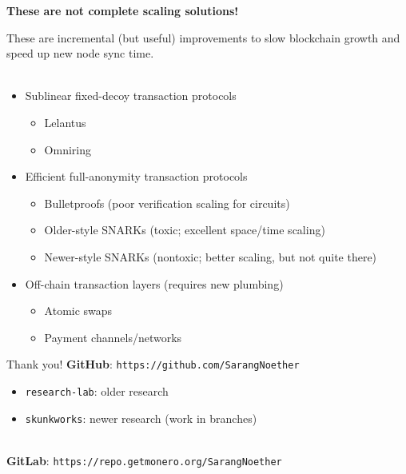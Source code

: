 \documentclass[aspectratio=169]{beamer}
\begin{document}
\begin{frame}
\begin{center}
\textbf{These are not complete scaling solutions!}
\end{center}

These are incremental (but useful) improvements to slow blockchain growth and speed up new node sync time. \\~\\

\begin{itemize}
\item Sublinear fixed-decoy transaction protocols
\begin{itemize}
\item Lelantus
\item Omniring
\end{itemize}
\item Efficient full-anonymity transaction protocols
\begin{itemize}
\item Bulletproofs (poor verification scaling for circuits)
\item Older-style SNARKs (toxic; excellent space/time scaling)
\item Newer-style SNARKs (nontoxic; better scaling, but not quite there)
\end{itemize}
\item Off-chain transaction layers (requires new plumbing)
\begin{itemize}
\item Atomic swaps
\item Payment channels/networks
\end{itemize}
\end{itemize}
\end{frame}


\begin{frame}{Thank you!}
\textbf{GitHub}: \texttt{https://github.com/SarangNoether}
\begin{itemize}
\item \texttt{research-lab}: older research
\item \texttt{skunkworks}: newer research (work in branches) \\~\\
\end{itemize}

\textbf{GitLab}: \texttt{https://repo.getmonero.org/SarangNoether}
\end{frame}
\end{document}
